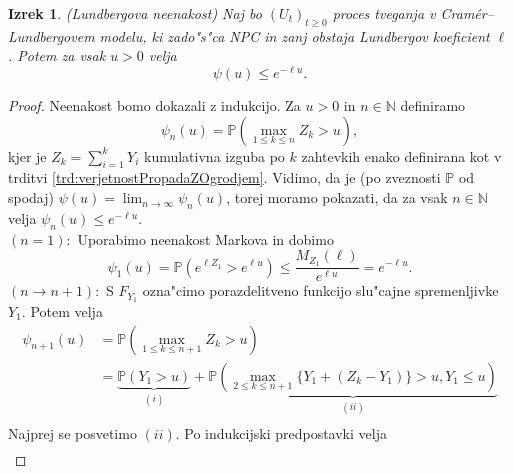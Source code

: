 \documentclass[12pt, a4paper, reqno]{amsart}
\theoremstyle{definition}
\theoremstyle{plain}
\newtheorem{izrek}[definicija]{Izrek}
\newcommand{\N}{\mathbb{N}}
\newcommand{\Prob}{\mathbb{P}}
\newcommand{\1}{\mathds{1}}
\begin{document}
            \begin{izrek}(Lundbergova neenakost)
                Naj bo $(U_t)_{t\geq0}$ proces tveganja v Cramér--Lundbergovem modelu, ki zado"s"ca NPC in 
                 zanj obstaja Lundbergov koeficient $\ell$. Potem za vsak $u>0$ velja
                \begin{equation*}
                    \psi(u) \leq e^{-\ell u}.
                \end{equation*}
                \label{izr:LundbergovaNeenakost}
            \end{izrek}

            \begin{proof}
                Neenakost bomo dokazali z indukcijo. Za $u>0$ in $n\in\N$ definiramo
                \begin{equation*}
                    \psi_n(u) = \Prob\left(\max_{1\leq k\leq n}Z_k > u\right),
                \end{equation*}
                kjer je $Z_k = \sum_{i=1}^kY_i$ kumulativna izguba po $k$ zahtevkih enako definirana 
                kot v trditvi \ref{trd:verjetnostPropadaZOgrodjem}.
                Vidimo, da je (po zveznosti $\mathbb{P}$ od spodaj) $\psi(u) = \lim_{n\to\infty}\psi_n(u)$, 
                torej moramo pokazati, da za vsak $n\in\N$ velja $\psi_n(u) \leq e^{-\ell u}$. \\
                $(n = 1):$ Uporabimo neenakost Markova in dobimo
                \begin{equation*}
                    \psi_1(u) = \Prob\left(e^{\ell Z_1} > e^{\ell u}\right) \leq \frac{M_{Z_1}(\ell)}{e^{\ell u}} = e^{-\ell u}.
                \end{equation*}
                $(n \rightarrow n+1):$ 
                S $F_{Y_1}$ ozna"cimo porazdelitveno funkcijo slu"cajne spremenljivke
                 $Y_1$. Potem velja
                \begin{align*}
                    \psi_{n+1}(u) &= \Prob\left(\max_{1\leq k\leq n+1}Z_k > u\right) \\
                                  &= \underbrace{\Prob\left(Y_1 > u\right)}_{(i)} + 
                                  \underbrace{\Prob\left(\max_{2\leq k\leq n+1}\bigl\{Y_1 + (Z_k - Y_1)\bigr\} > u, Y_1 \leq u\right)}_{(ii)} \\
                \end{align*}
                Najprej se posvetimo $(ii)$. Po indukcijski predpostavki velja 
                \begin{align*}

\end{align*}
\end{proof}
\end{document}
